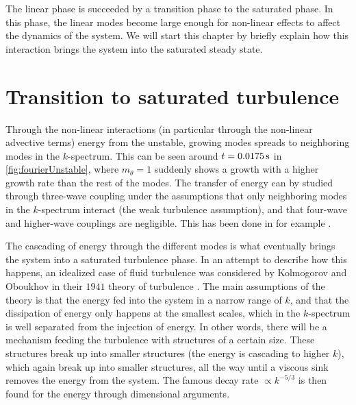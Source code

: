%
The linear phase is succeeded by a transition phase to the saturated phase.
In this phase, the linear modes become large enough for non-linear effects to affect the dynamics of the system.
We will start this chapter by briefly explain how this interaction brings the system into the saturated steady state.

\section{Transition to saturated turbulence}
Through the non-linear interactions (in particular through the non-linear advective terms) energy from the unstable, growing modes spreads to neighboring modes in the $k$-spectrum.
This can be seen around $t=0.0175\, \text{s}$ in \cref{fig:fourierUnstable}, where $m_\theta=1$ suddenly shows a growth with a higher growth rate than the rest of the modes.
The transfer of energy can by studied through three-wave coupling under the assumptions that only neighboring modes in the $k$-spectrum interact (the weak turbulence assumption), and that four-wave and higher-wave couplings are negligible.
This has been done in for example \cite{Ritz1989,Knorr1990}.

The cascading of energy through the different modes is what eventually brings the system into a saturated turbulence phase.
In an attempt to describe how this happens, an idealized case of fluid turbulence was considered by Kolmogorov and Oboukhov in their $1941$ theory of turbulence \cite{Kolmogorov1962}.
The main assumptions of the theory is that the energy fed into the system in a narrow range of $k$, and that the dissipation of energy only happens at the smallest scales, which in the $k$-spectrum is well separated from the injection of energy.
In other words, there will be a mechanism feeding the turbulence with structures of a certain size.
These structures break up into smaller structures (the energy is cascading to higher $k$), which again break up into smaller structures, all the way until a viscous sink removes the energy from the system.
The famous decay rate $\propto k^{-5/3}$ is then found for the energy through dimensional arguments.


